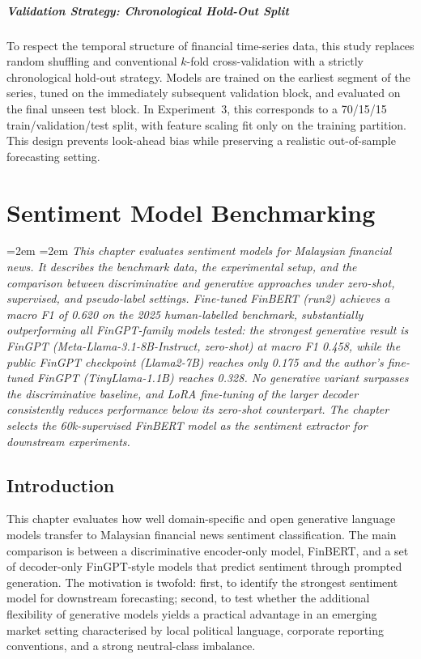 \documentclass[12pt]{ucetd}
\newcommand{\chapterabstract}[1]{%
  \par\vspace{1em}
  \begingroup
  \leftskip=2em
  \rightskip=2em
  \noindent\itshape
  #1
  \par
  \endgroup
  \vspace{1.5em}
}
\begin{document}
\paragraph{Validation Strategy: Chronological Hold-Out Split}

To respect the temporal structure of financial time-series data, this study replaces random shuffling and conventional $k$-fold cross-validation with a strictly chronological hold-out strategy. Models are trained on the earliest segment of the series, tuned on the immediately subsequent validation block, and evaluated on the final unseen test block. In Experiment~3, this corresponds to a 70/15/15 train/validation/test split, with feature scaling fit only on the training partition. This design prevents look-ahead bias while preserving a realistic out-of-sample forecasting setting.


\chapter{Sentiment Model Benchmarking}

\chapterabstract{This chapter evaluates sentiment models for Malaysian financial news. It describes the benchmark data, the experimental setup, and the comparison between discriminative and generative approaches under zero-shot, supervised, and pseudo-label settings. Fine-tuned FinBERT (run2) achieves a macro F1 of 0.620 on the 2025 human-labelled benchmark, substantially outperforming all FinGPT-family models tested: the strongest generative result is FinGPT (Meta-Llama-3.1-8B-Instruct, zero-shot) at macro F1 0.458, while the public FinGPT checkpoint (Llama2-7B) reaches only 0.175 and the author's fine-tuned FinGPT (TinyLlama-1.1B) reaches 0.328. No generative variant surpasses the discriminative baseline, and LoRA fine-tuning of the larger decoder consistently reduces performance below its zero-shot counterpart. The chapter selects the 60k-supervised FinBERT model as the sentiment extractor for downstream experiments.}

\section{Introduction}
This chapter evaluates how well domain-specific and open generative language models transfer to Malaysian financial news sentiment classification. The main comparison is between a discriminative encoder-only model, FinBERT, and a set of decoder-only FinGPT-style models that predict sentiment through prompted generation. The motivation is twofold: first, to identify the strongest sentiment model for downstream forecasting; second, to test whether the additional flexibility of generative models yields a practical advantage in an emerging market setting characterised by local political language, corporate reporting conventions, and a strong neutral-class imbalance.
\end{document}
